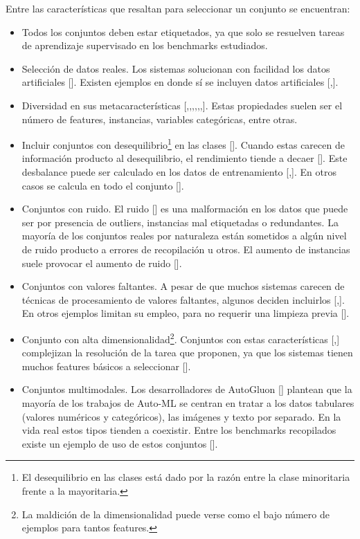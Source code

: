 Entre las características que  resaltan para seleccionar un conjunto se encuentran:
\begin{itemize}
    \item Todos los conjuntos deben estar etiquetados, ya que solo se resuelven tareas de aprendizaje supervisado en los benchmarks estudiados.
    \item Selección de datos reales. Los sistemas solucionan con facilidad los datos artificiales [\cite{15}]. Existen ejemplos en donde sí 
    se incluyen datos artificiales [\cite{10},\cite{16}]. 
    \item Diversidad en sus metacaracterísticas [\cite{10},\cite{15},\cite{28},\cite{17},\cite{16},\cite{18},\cite{22}]. Estas propiedades suelen ser
    el número de features, instancias, variables categóricas, entre otras.
    \item Incluir conjuntos con desequilibrio\footnote{El desequilibrio en las clases está dado por la razón entre la clase minoritaria frente a la mayoritaria.} en 
    las clases [\cite{31}\cite{16}]. Cuando estas carecen de información producto al desequilibrio, el rendimiento tiende a decaer [\cite{16}]. Este desbalance puede 
    ser calculado en los datos de entrenamiento [\cite{11},\cite{29}]. En otros casos se calcula en todo el conjunto [\cite{31}]. 
    \item Conjuntos con ruido. El ruido [\cite{47}] es una malformación en los datos que puede ser por presencia de outliers, instancias mal etiquetadas o 
    redundantes. La mayoría de los conjuntos reales por naturaleza están sometidos a algún nivel de ruido producto a errores de recopilación u otros. 
    El aumento de instancias suele provocar el aumento de ruido [\cite{24}]. 
    \item Conjuntos con valores faltantes. A pesar de que muchos sistemas carecen de técnicas de procesamiento de valores faltantes, algunos deciden incluirlos 
    [\cite{10},\cite{11}]. En otros ejemplos limitan su empleo, para no requerir una limpieza previa [\cite{18}].
    \item Conjunto con alta dimensionalidad\footnote{La maldición de la dimensionalidad puede verse como el bajo número de ejemplos para tantos features.}. 
    Conjuntos con estas características [\cite{11},\cite{24}] complejizan la resolución de la tarea que proponen, ya que los sistemas tienen muchos features básicos 
    a seleccionar [\cite{47}].
    \item Conjuntos multimodales. Los desarrolladores de AutoGluon [\cite{42}] plantean que la mayoría de los trabajos de Auto-ML se centran en tratar a los datos 
    tabulares (valores numéricos y categóricos), las imágenes y texto por separado. En la vida real estos tipos tienden a coexistir. Entre los benchmarks recopilados 
    existe un ejemplo de uso de estos conjuntos [\cite{27}]. 
   
    \end{itemize} 
